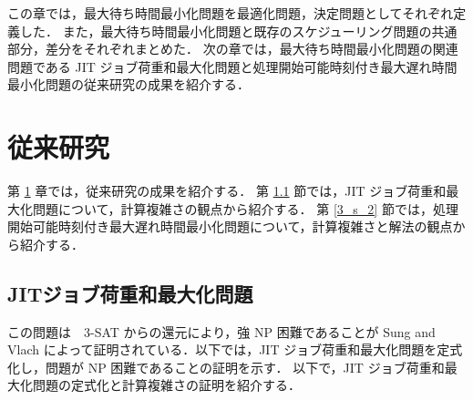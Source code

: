 \documentclass[12pt]{optlab-bachelor}
\begin{document}
この章では，最大待ち時間最小化問題を最適化問題，決定問題としてそれぞれ定義した．
また，最大待ち時間最小化問題と既存のスケジューリング問題の共通部分，差分をそれぞれまとめた．
次の章では，最大待ち時間最小化問題の関連問題である JIT ジョブ荷重和最大化問題と処理開始可能時刻付き最大遅れ時間最小化問題の従来研究の成果を紹介する．

\chapter{従来研究}\label{c_3}
第 \ref{c_3} 章では，従来研究の成果を紹介する．
第 \ref{3_s_1} 節では，JIT ジョブ荷重和最大化問題について，計算複雑さの観点から紹介する．
第 \ref{3_s_2} 節では，処理開始可能時刻付き最大遅れ時間最小化問題について，計算複雑さと解法の観点から紹介する．

\section{JITジョブ荷重和最大化問題}\label{3_s_1}
この問題は　\textsc{3-SAT} からの還元により，強 NP 困難であることが Sung and Vlach \cite{SJIT} によって証明されている．以下では，JIT ジョブ荷重和最大化問題を定式化し，問題が NP 困難であることの証明を示す．
以下で，JIT ジョブ荷重和最大化問題の定式化と計算複雑さの証明を紹介する．
\end{document}
